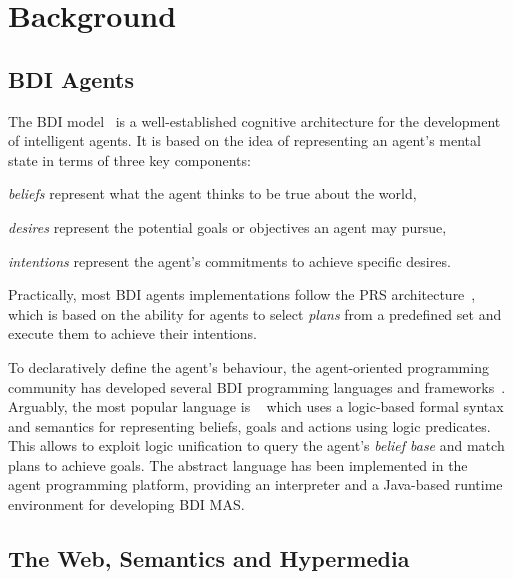 \documentclass[
]{ceurart}
\begin{document}
\section{Background}
\label{sec:background}

\subsection{BDI Agents}

The \ac{BDI} model~\cite{DBLP:conf/atal/GeorgeffPPTW98}
is a well-established cognitive architecture for the development of intelligent agents.
%
It is based on the idea of representing an agent's mental state in terms of three key components:
\begin{inlinelist}
  \item \emph{beliefs} represent what the agent thinks to be true about the world,
  \item \emph{desires} represent the potential goals or objectives an agent may pursue,
  \item \emph{intentions} represent the agent's commitments to achieve specific desires.
\end{inlinelist}
%
Practically, most \ac{BDI} agents implementations follow the \ac{PRS} architecture~\cite{georgeff1986pieee},
which is based on the ability for agents to select \emph{plans} from a predefined set
and execute them to achieve their intentions.

To declaratively define the agent's behaviour, the agent-oriented programming community has developed several \ac{BDI} programming languages and frameworks~\cite{DBLP:conf/woa/MascardiDA05}.
%
Arguably, the most popular language is \agentspeak{}~\cite{DBLP:conf/maamaw/Rao96} which 
uses a logic-based formal syntax and semantics for representing beliefs, goals and actions using logic predicates.
This allows to exploit logic unification to query the agent's \emph{belief base} and match plans to achieve goals.
The \agentspeak{} abstract language has been implemented in the \jason{}~\cite{bordini2007programming} agent programming platform, providing an interpreter and a Java-based runtime environment for developing \ac{BDI} \ac{MAS}.

\subsection{The Web, Semantics and Hypermedia}

\end{document}
